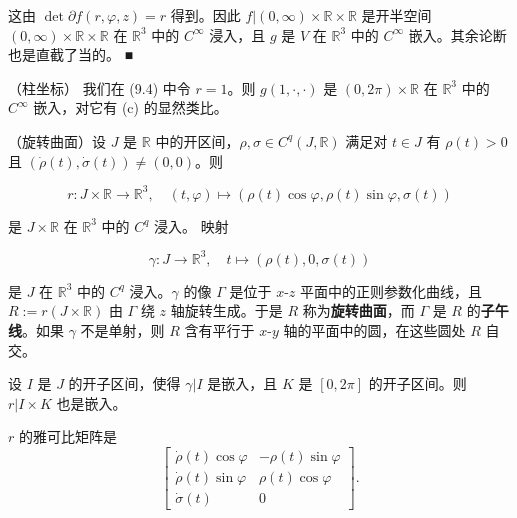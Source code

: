 \begin{example}
这由 $ \det\partial f(r, \varphi, z) = r $ 得到。因此 $ f|(0, \infty) \times \mathbb{R} \times \mathbb{R} $ 是开半空间 $ (0, \infty) \times \mathbb{R} \times \mathbb{R} $ 在 $ \mathbb{R}^{3} $ 中的 $ C^{\infty} $ 浸入，且 $ g $ 是 $ V $ 在 $ \mathbb{R}^{3} $ 中的 $ C^{\infty} $ 嵌入。其余论断也是直截了当的。 \nobreak\hspace{0.35em}■

\begin{items}
\item[（d）]

（柱坐标）
我们在 (9.4) 中令 $ r = 1 $。则 $ g(1, \cdot, \cdot) $ 是 $ (0, 2\pi) \times \mathbb{R} $ 在 $ \mathbb{R}^{3} $ 中的 $ C^{\infty} $ 嵌入，对它有 (c) 的显然类比。

\end{items}


\begin{items}
\item[（e）]

（旋转曲面）设 $ J $ 是 $ \mathbb{R} $ 中的开区间，$ \rho, \sigma \in C^{q}(J, \mathbb{R}) $ 满足对 $ t \in J $ 有 $ \rho(t) > 0 $ 且 $ (\dot{\rho}(t), \dot{\sigma}(t)) \ne (0, 0) $。则

\[
r : J \times \mathbb{R} \to \mathbb{R}^{3} , \quad (t, \varphi) \mapsto (\rho(t)\cos\varphi, \rho(t)\sin\varphi, \sigma(t))
\]

是 $ J \times \mathbb{R} $ 在 $ \mathbb{R}^{3} $ 中的 $ C^{q} $ 浸入。
映射

\[
\gamma : J \to \mathbb{R}^{3} , \quad t \mapsto (\rho(t), 0, \sigma(t))
\]

是 $ J $ 在 $ \mathbb{R}^{3} $ 中的 $ C^{q} $ 浸入。$ \gamma $ 的像 $ \Gamma $ 是位于 $ x $-$ z $ 平面中的正则参数化曲线，且 $ R := r(J \times \mathbb{R}) $ 由 $ \Gamma $ 绕 $ z $ 轴旋转生成。于是 $ R $ 称为\textbf{旋转曲面}，而 $ \Gamma $ 是 $ R $ 的\textbf{子午线}。如果 $ \gamma $ 不是单射，则 $ R $ 含有平行于 $ x $-$ y $ 轴的平面中的圆，在这些圆处 $ R $ 自交。

\end{items}


设 $ I $ 是 $ J $ 的开子区间，使得 $ \gamma|I $ 是嵌入，且 $ K $ 是 $ [0, 2\pi] $ 的开子区间。则 $ r|I \times K $ 也是嵌入。

\proofhead
$ r $ 的雅可比矩阵是
\begin{equation}
\begin{bmatrix} \dot{\rho}(t)\cos\varphi & -\rho(t)\sin\varphi \\ \dot{\rho}(t)\sin\varphi & \rho(t)\cos\varphi \\ \dot{\sigma}(t) & 0 \end{bmatrix} .\tag{9.5}
\end{equation}


\end{example}
